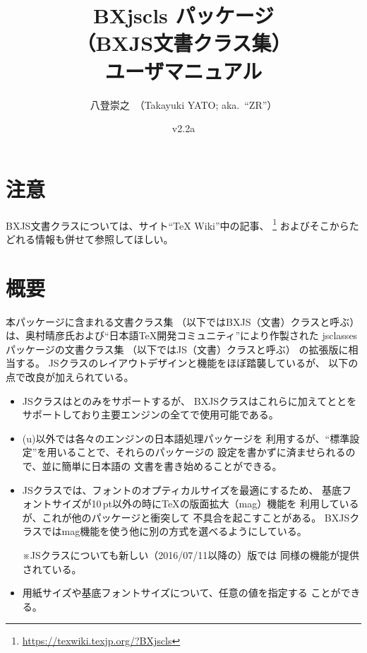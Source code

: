 \documentclass[a4paper]{ltjsarticle}
\newcommand{\PkgVersion}{2.2a}
\newcommand{\PkgDate}{2020/09/22}
\newcommand{\Pkg}[1]{\textsf{#1}}
\newcommand{\Note}{\par\noindent ※}
\newcommand{\jemph}{\textsf}
\begin{document}
\title{\Pkg{BXjscls} パッケージ\\
  （BXJS文書クラス集）\\
  ユーザマニュアル}
\author{八登崇之\ （Takayuki YATO; aka.~``ZR''）}
\date{v\PkgVersion\quad[\PkgDate]}
\maketitle
\tableofcontents

\section*{注意}

BXJS文書クラスについては、サイト“{\TeX} Wiki”中の記事、
\footnote{\url{https://texwiki.texjp.org/?BXjscls}}%
およびそこからたどれる情報も併せて参照してほしい。

\section{概要}
\label{sec:Ovewview}

本パッケージに含まれる文書クラス集
（以下では\jemph{BXJS（文書）クラス}と呼ぶ）
は、奥村晴彦氏および“日本語{\TeX}開発コミュニティ”により作製された
\Pkg{jsclasses}パッケージの文書クラス集
（以下では\jemph{JS（文書）クラス}と呼ぶ）
の拡張版に相当する。
JSクラスのレイアウトデザインと機能をほぼ踏襲しているが、
以下の点で改良が加えられている。
\begin{itemize}
\item JSクラスは{\pLaTeX}と{\upLaTeX}のみをサポートするが、
  BXJSクラスはこれらに加えて{\pdfLaTeX}と{\XeLaTeX}と{\LuaLaTeX}を
  サポートしており主要エンジンの全てで使用可能である。
\item (u){\pLaTeX}以外では各々のエンジンの日本語処理パッケージを
  利用するが、“標準設定”を用いることで、それらのパッケージの
  設定を書かずに済ませられるので、{\pLaTeX}並に簡単に日本語の
  文書を書き始めることができる。
\item JSクラスでは、フォントのオプティカルサイズを最適にするため、
  基底フォントサイズが10\,pt以外の時に{\TeX}の版面拡大（mag）機能を
  利用しているが、これが他のパッケージと衝突して
  不具合を起こすことがある。
  BXJSクラスではmag機能を使う他に別の方式を選べるようにしている。
  \Note JSクラスについても新しい（2016/07/11以降の）版では
  同様の機能が提供されている。
\item 用紙サイズや基底フォントサイズについて、任意の値を指定する
  ことができる。
\end{itemize}
\end{document}

